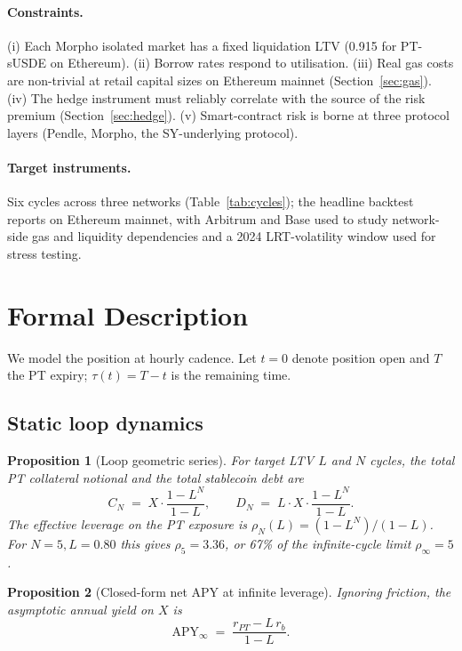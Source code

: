 \documentclass[11pt,a4paper]{article}
\newtheorem{proposition}{Proposition}
\begin{document}
\paragraph{Constraints.}
(i) Each Morpho isolated market has a fixed liquidation LTV
(0.915 for PT-sUSDE on Ethereum).
(ii) Borrow rates respond to utilisation.
(iii) Real gas costs are non-trivial at retail capital sizes
on Ethereum mainnet (Section~\ref{sec:gas}).
(iv) The hedge instrument must reliably correlate with the source
of the risk premium (Section~\ref{sec:hedge}).
(v) Smart-contract risk is borne at three protocol layers (Pendle,
Morpho, the SY-underlying protocol).

\paragraph{Target instruments.} Six cycles across three networks
(Table~\ref{tab:cycles}); the headline backtest reports on Ethereum
mainnet, with Arbitrum and Base used to study network-side gas and
liquidity dependencies and a 2024 LRT-volatility window used for
stress testing.

\section{Formal Description}
\label{sec:formal}

We model the position at hourly cadence. Let \(t=0\) denote
position open and \(T\) the PT expiry; \(\tau(t) = T - t\) is the
remaining time.

\subsection{Static loop dynamics}

\begin{proposition}[Loop geometric series]
\label{prop:loop}
For target LTV \(L\) and \(N\) cycles, the total PT collateral
notional and the total stablecoin debt are
\begin{equation}
  C_N \;=\; X \cdot \frac{1 - L^N}{1 - L},
  \qquad
  D_N \;=\; L \cdot X \cdot \frac{1 - L^N}{1 - L}.
  \label{eq:geom}
\end{equation}
The effective leverage on the PT exposure is
\(\rho_N(L) = (1-L^N)/(1-L)\). For \(N=5, L=0.80\) this gives
\(\rho_5 = 3.36\), or 67\% of the infinite-cycle limit
\(\rho_\infty = 5\).
\end{proposition}

\begin{proposition}[Closed-form net APY at infinite leverage]
\label{prop:apy}
Ignoring friction, the asymptotic annual yield on \(X\) is
\begin{equation}
  \mathrm{APY}_{\infty}
    \;=\; \frac{r_{PT} - L\,r_b}{1 - L}.
  \label{eq:apy}
\end{equation}
\end{proposition}
\end{document}
